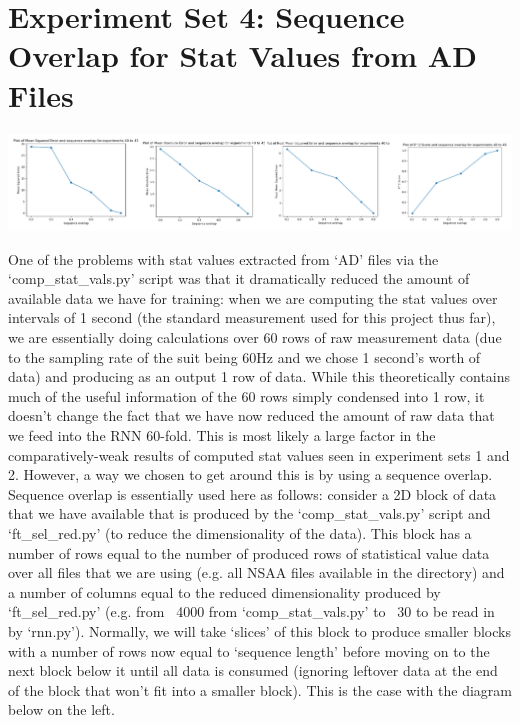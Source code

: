 \documentclass[12pt,twoside]{report}
\begin{document}
\section{Experiment Set 4: Sequence Overlap for Stat Values from AD Files}

\begin{center}
\includegraphics[scale=0.4]{project_figures/fig10_10}
\end{center}

\quad One of the problems with stat values extracted from ‘AD’ files via the ‘comp\_stat\_vals.py’ script was that it dramatically reduced the amount of available data we have for training: when we are computing the stat values over intervals of 1 second (the standard measurement used for this project thus far), we are essentially doing calculations over 60 rows of raw measurement data (due to the sampling rate of the suit being 60Hz and we chose 1 second’s worth of data) and producing as an output 1 row of data. While this theoretically contains much of the useful information of the 60 rows simply condensed into 1 row, it doesn’t change the fact that we have now reduced the amount of raw data that we feed into the RNN 60-fold. This is most likely a large factor in the comparatively-weak results of computed stat values seen in experiment sets 1 and 2. However, a way we chosen to get around this is by using a sequence overlap.\\

\quad Sequence overlap is essentially used here as follows: consider a 2D block of data that we have available that is produced by the ‘comp\_stat\_vals.py’ script and ‘ft\_sel\_red.py’ (to reduce the dimensionality of the data). This block has a number of rows equal to the number of produced rows of statistical value data over all files that we are using (e.g. all NSAA files available in the directory) and a number of columns equal to the reduced dimensionality produced by ‘ft\_sel\_red.py’ (e.g. from ~4000 from ‘comp\_stat\_vals.py’ to ~30 to be read in by ‘rnn.py’). Normally, we will take ‘slices’ of this block to produce smaller blocks with a number of rows now equal to ‘sequence length’ before moving on to the next block below it until all data is consumed (ignoring leftover data at the end of the block that won’t fit into a smaller block). This is the case with the diagram below on the left.
\end{document}
